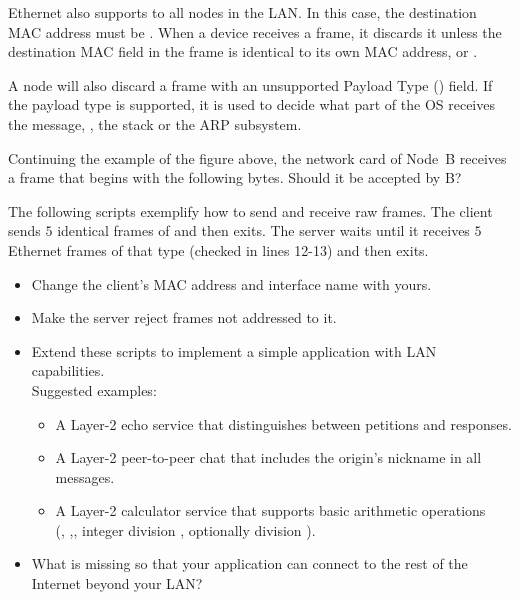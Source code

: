 Ethernet also supports  to all nodes in the LAN. In this case, the destination
MAC address must be .
% 
When a device receives a frame, it discards it unless the destination MAC field in the frame
is identical to its own MAC address, or . 

A node will also discard a frame with an unsupported Payload Type () field. 
% 
If the payload type is supported, it is used to decide what part of the OS receives the message,
\eg, the  stack or the ARP subsystem.

\begin{exercise} Continuing the example of the figure above, the network card of Node~B receives
a frame that begins with the following bytes. Should it be accepted by B?
\begin{center}
\end{center}
\end{exercise}

\begin{exercise}
The following scripts exemplify how to send and receive raw  frames. 
The client sends $5$ identical frames of   and then exits.
The server waits until it receives $5$ Ethernet frames of that type (checked in lines 12-13) and then exits.
% 
\begin{itemize}
\item Change the client's MAC address and interface name with yours.
\item Make the server reject frames not addressed to it.
\item Extend these scripts to implement a simple application with LAN capabilities.\\
  Suggested examples:
    \begin{itemize}
    \item A Layer-2 echo service that distinguishes between petitions and responses.
    \item A Layer-2 peer-to-peer chat that includes the origin's nickname in all messages.
    \item A Layer-2 calculator service that supports basic arithmetic operations\\
      (\inlineCode{+}, \inlineCode{-},\inlineCode{*}, integer division \inlineCode{//}, optionally division \inlineCode{/}).
    \end{itemize}
\item What is missing so that your application can connect to the rest of the Internet beyond your LAN?
\end{itemize}

\label{ex:layer2:echo}
\end{exercise}

